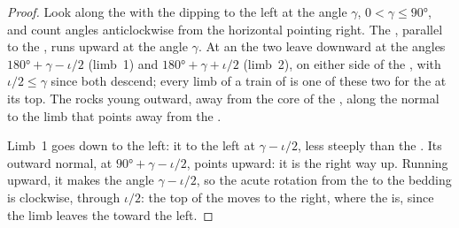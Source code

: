 \begin{proof}
Look along the  with the  dipping to the left at the angle
$\gamma$, $0 < \gamma \le \ang{90}$, and count angles anticlockwise from the
horizontal pointing right. The , parallel to the , runs
upward at the angle $\gamma$. At an   the two  leave
downward at the angles $\ang{180} + \gamma - \iota/2$ (limb~1) and
$\ang{180} + \gamma + \iota/2$ (limb~2), on either side of the ,
with $\iota/2 \le \gamma$ since both descend; every limb of a train of 
is one of these two for the  at its top. The rocks young outward,
away from the core of the , along the normal to the limb that points
away from the .

Limb~1 goes down to the left: it  to the left at $\gamma - \iota/2$, less
steeply than the . Its outward normal, at $\ang{90} + \gamma -
\iota/2$, points upward: it is the right way up. Running upward, it makes the
angle $\gamma - \iota/2$, so the acute rotation from the  to the bedding
is clockwise, through $\iota/2$: the top of the  moves to the right,
where the  is, since the limb leaves the  toward the left.


\end{proof}
